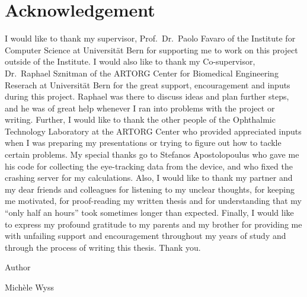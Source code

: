 \section*{Acknowledgement}
I would like to thank my supervisor, Prof.\ Dr.\ Paolo Favaro of the Institute for Computer Science at Universit\"at Bern for supporting me to work on this project outside of the Institute. I would also like to thank my Co-supervisor, Dr.\ Raphael Sznitman of the ARTORG Center for Biomedical Engineering Reserach at Universit\"at Bern for the great support, encouragement and inputs during this project. Raphael was there to discuss ideas and plan further steps, and he was of great help whenever I ran into problems with the project or writing. Further, I would like to thank the other people of the Ophthalmic Technology Laboratory at the ARTORG Center who provided appreciated inputs when I was preparing my presentations or trying to figure out how to tackle certain problems. My special thanks go to Stefanos Apostolopoulus who gave me his code for collecting the eye-tracking data from the device, and who fixed the crashing server for my calculations. Also, I would like to thank my partner and my dear friends and colleagues for listening to my unclear thoughts, for keeping me motivated, for proof-reading my written thesis and for understanding that my ``only half an hours'' took sometimes longer than expected. Finally, I would like to express my profound gratitude to my parents and my brother for providing me with unfailing support and encouragement throughout my years of study and through the process of writing this thesis. Thank you.

\vspace{1cm}
\noindent Author

\vspace{1cm}
\noindent Mich\`ele Wyss